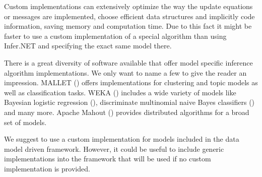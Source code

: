 Custom implementations can extensively optimize the way the update equations or messages are implemented, choose efficient data structures and implicitly code information, saving memory and computation time. Due to this fact it might be faster to use a custom implementation of a special algorithm than using Infer.NET and specifying the exact same model there.

There is a great diversity of software available that offer model specific inference algorithm implementations. We only want to name a few to give the reader an impression. MALLET (\cite{mccallum2002mallet}) offers implementations for clustering and topic models as well as classification tasks. WEKA (\cite{hall2009weka}) includes a wide variety of models like Bayesian logistic regression (\cite{genkin2007large}), discriminate multinomial naive Bayes classifiers (\cite{talia2005weka4ws}) and many more. Apache Mahout (\cite{mahout}) provides distributed algorithms for a broad set of models.

We suggest to use a custom implementation for models included in the data model driven framework. However, it could be useful to include generic implementations into the framework that will be used if no custom implementation is provided.
